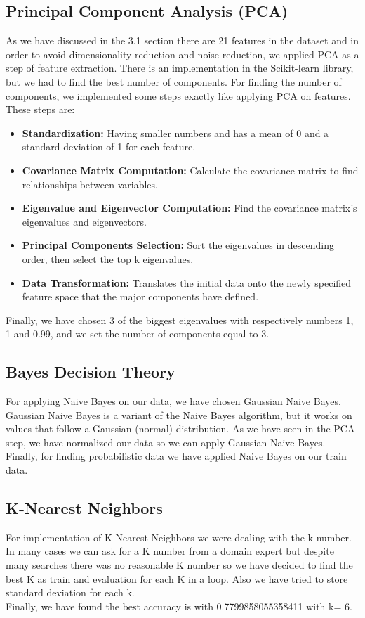 \documentclass[12pt]{article}
\begin{document}
\subsection{Principal Component Analysis (PCA)}
As we have discussed in the 3.1 section there are 21 features in the dataset and in order to avoid dimensionality reduction and noise reduction, we applied PCA as a step of feature extraction.
There is an implementation in the Scikit-learn library, but we had to find the best number of components. For finding the number of components, we implemented some steps exactly like applying PCA on features. These steps are:
\begin{itemize}
  \item \textbf{Standardization:} Having smaller numbers and has a mean of 0 and a standard deviation of 1 for each feature.
  \item \textbf{Covariance Matrix Computation:} Calculate the covariance matrix to find relationships between variables.
  \item \textbf{Eigenvalue and Eigenvector Computation:} Find the covariance matrix's eigenvalues and eigenvectors.
  \item \textbf{Principal Components Selection:} Sort the eigenvalues in descending order, then select the top k eigenvalues.
  \item \textbf{Data Transformation:} Translates the initial data onto the newly specified feature space that the major components have defined.
\end{itemize}
Finally, we have chosen 3 of the biggest eigenvalues with respectively numbers 1, 1 and 0.99, and we set the number of components equal to 3.

\subsection{Bayes Decision Theory}
For applying Naive Bayes on our data, we have chosen Gaussian Naive Bayes. Gaussian Naive Bayes is a variant of the Naive Bayes algorithm, but it works on values that follow a Gaussian (normal) distribution. As we have seen in the PCA step, we have normalized our data so we can apply Gaussian Naive Bayes.
Finally, for finding probabilistic data we have applied Naive Bayes on our train data.

\subsection{K-Nearest Neighbors}
For implementation of K-Nearest Neighbors we were dealing with the k number. In many cases we can ask for a K number from a domain expert but despite many searches there was no reasonable K number so we have decided to find the best K as train and evaluation for each K in a loop. Also we have tried to store standard deviation for each k.\\
Finally, we have found the best accuracy is with 0.7799858055358411 with k= 6.
\end{document}
